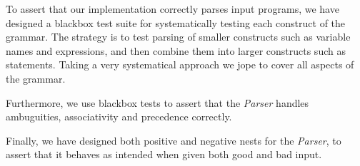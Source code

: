 To assert that our implementation correctly parses input programs, we have designed a blackbox test suite for systematically testing each construct of the grammar.
The strategy is to test parsing of smaller constructs such as variable names and expressions, and then combine them into larger constructs such as statements.
Taking a very systematical approach we jope to cover all aspects of the grammar.

Furthermore, we use blackbox tests to assert that the \textit{Parser} handles ambuguities, associativity and precedence correctly.

Finally, we have designed both positive and negative nests for the \textit{Parser}, to assert that it behaves as intended when given both good and bad input.
